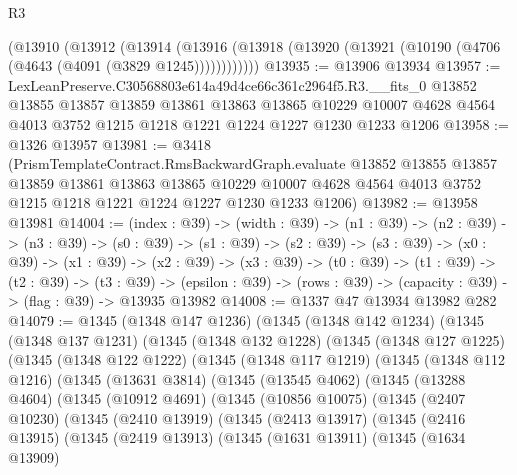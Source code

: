 \begin{lexlean}{R3}
\begin{coremodule}
    (@13910
      (@13912
        (@13914
          (@13916 (@13918 (@13920 (@13921 (@10190 (@4706 (@4643 (@4091 (@3829 @1245))))))))))))
@13935 := @13906 @13934
@13957 := LexLeanPreserve.C30568803e614a49d4ce66c361c2964f5.R3.__fits_0
    @13852
    @13855
    @13857
    @13859
    @13861
    @13863
    @13865
    @10229
    @10007
    @4628
    @4564
    @4013
    @3752
    @1215
    @1218
    @1221
    @1224
    @1227
    @1230
    @1233
    @1206
@13958 := @1326 @13957
@13981 := @3418
    (PrismTemplateContract.RmsBackwardGraph.evaluate
      @13852
      @13855
      @13857
      @13859
      @13861
      @13863
      @13865
      @10229
      @10007
      @4628
      @4564
      @4013
      @3752
      @1215
      @1218
      @1221
      @1224
      @1227
      @1230
      @1233
      @1206)
@13982 := @13958 @13981
@14004 := (index : @39) ->
  (width : @39) ->
  (n1 : @39) ->
  (n2 : @39) ->
  (n3 : @39) ->
  (s0 : @39) ->
  (s1 : @39) ->
  (s2 : @39) ->
  (s3 : @39) ->
  (x0 : @39) ->
  (x1 : @39) ->
  (x2 : @39) ->
  (x3 : @39) ->
  (t0 : @39) ->
  (t1 : @39) ->
  (t2 : @39) ->
  (t3 : @39) -> (epsilon : @39) -> (rows : @39) -> (capacity : @39) -> (flag : @39) -> @13935 @13982
@14008 := @1337 @47 @13934 @13982 @282
@14079 := @1345
    (@1348 @147 @1236)
    (@1345
      (@1348 @142 @1234)
      (@1345
        (@1348 @137 @1231)
        (@1345
          (@1348 @132 @1228)
          (@1345
            (@1348 @127 @1225)
            (@1345
              (@1348 @122 @1222)
              (@1345
                (@1348 @117 @1219)
                (@1345
                  (@1348 @112 @1216)
                  (@1345
                    (@13631 @3814)
                    (@1345
                      (@13545 @4062)
                      (@1345
                        (@13288 @4604)
                        (@1345
                          (@10912 @4691)
                          (@1345
                            (@10856 @10075)
                            (@1345
                              (@2407 @10230)
                              (@1345
                                (@2410 @13919)
                                (@1345
                                  (@2413 @13917)
                                  (@1345
                                    (@2416 @13915)
                                    (@1345
                                      (@2419 @13913)
                                      (@1345
                                        (@1631 @13911)
                                        (@1345
                                          (@1634 @13909)

\end{coremodule}
\end{lexlean}
